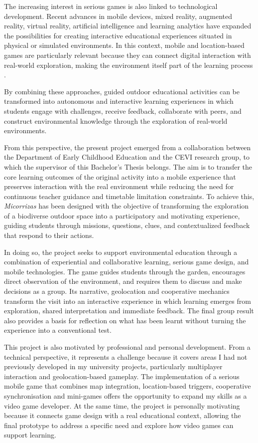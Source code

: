 The increasing interest in serious games is also linked to technological development. Recent advances in mobile devices, mixed reality, augmented reality, virtual reality, artificial intelligence and learning analytics have expanded the possibilities for creating interactive educational experiences situated in physical or simulated environments. In this context, mobile and location-based games are particularly relevant because they can connect digital interaction with real-world exploration, making the environment itself part of the learning process \cite{gomez2019mixed, hands2026serious}.

By combining these approaches, guided outdoor educational activities can be transformed into autonomous and interactive learning experiences in which students engage with challenges, receive feedback, collaborate with peers, and construct environmental knowledge through the exploration of real-world environments.

From this perspective, the present project emerged from a collaboration between the Department of Early Childhood Education and the CEVI research group, to which the supervisor of this Bachelor’s Thesis belongs. The aim is to transfer the core learning outcomes of the original activity into a mobile experience that preserves interaction with the real environment while reducing the need for continuous teacher guidance and timetable limitation constraints. To achieve this, \textit{Micorrizas} has been designed with the objective of transforming the exploration of a biodiverse outdoor space into a participatory and motivating experience, guiding students through missions, questions, clues, and contextualized feedback that respond to their actions. 

In doing so, the project seeks to support environmental education through a combination of experiential and collaborative learning, serious game design, and mobile technologies. The game guides students through the garden, encourages direct observation of the environment, and requires them to discuss and make decisions as a group. Its narrative, geolocation and cooperative mechanics transform the visit into an interactive experience in which learning emerges from exploration, shared interpretation and immediate feedback. The final group result also provides a basis for reflection on what has been learnt without turning the experience into a conventional test.

This project is also motivated by professional and personal development. From a technical perspective, it represents a challenge because it covers areas I had not previously developed in my university projects, particularly multiplayer interaction and geolocation-based gameplay. The implementation of a serious mobile game that combines map integration, location-based triggers, cooperative synchronisation and mini-games offers the opportunity to expand my skills as a video game developer. At the same time, the project is personally motivating because it connects game design with a real educational context, allowing the final prototype to address a specific need and explore how video games can support learning.

